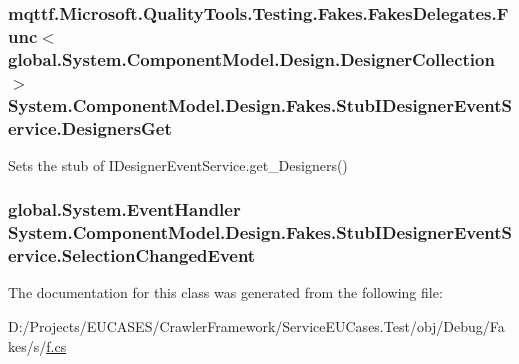 \hypertarget{class_system_1_1_component_model_1_1_design_1_1_fakes_1_1_stub_i_designer_event_service_a168af9440ee0681f739fd4b5ac0cf5ab}{
\subsubsection[{Designers\-Get}]{\setlength{\rightskip}{0pt plus 5cm}mqttf.\-Microsoft.\-Quality\-Tools.\-Testing.\-Fakes.\-Fakes\-Delegates.\-Func$<$global.\-System.\-Component\-Model.\-Design.\-Designer\-Collection$>$ System.\-Component\-Model.\-Design.\-Fakes.\-Stub\-I\-Designer\-Event\-Service.\-Designers\-Get}}\label{class_system_1_1_component_model_1_1_design_1_1_fakes_1_1_stub_i_designer_event_service_a168af9440ee0681f739fd4b5ac0cf5ab}


Sets the stub of I\-Designer\-Event\-Service.\-get\-\_\-\-Designers()

\hypertarget{class_system_1_1_component_model_1_1_design_1_1_fakes_1_1_stub_i_designer_event_service_ac678f0b4ee3f73faef54757cf33e1c09}{
\subsubsection[{Selection\-Changed\-Event}]{\setlength{\rightskip}{0pt plus 5cm}global.\-System.\-Event\-Handler System.\-Component\-Model.\-Design.\-Fakes.\-Stub\-I\-Designer\-Event\-Service.\-Selection\-Changed\-Event}}\label{class_system_1_1_component_model_1_1_design_1_1_fakes_1_1_stub_i_designer_event_service_ac678f0b4ee3f73faef54757cf33e1c09}


The documentation for this class was generated from the following file\-:\begin{DoxyCompactItemize}
\item 
D\-:/\-Projects/\-E\-U\-C\-A\-S\-E\-S/\-Crawler\-Framework/\-Service\-E\-U\-Cases.\-Test/obj/\-Debug/\-Fakes/s/\hyperlink{s_2f_8cs}{f.\-cs}\end{DoxyCompactItemize}
